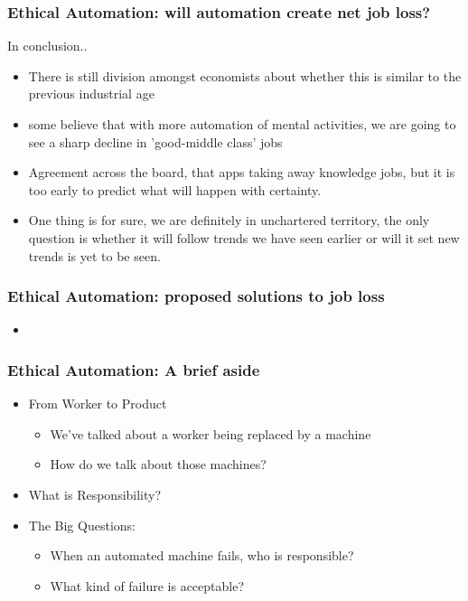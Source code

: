 \begin{frame}
  \frametitle{Ethical Automation: will automation create net job loss? }
  {\Large In conclusion..}
  \begin{itemize}
    \item There is still division amongst economists about whether this is similar to the previous industrial age
    \item some believe that with more automation of mental activities, we are going to see a sharp decline in 'good-middle class' jobs
    \item Agreement across the board, that apps taking away knowledge jobs, but it is too early to predict what will happen with certainty.
    \item One thing is for sure, we are definitely in unchartered territory, the only question is whether it will follow trends we have seen earlier or will it set new trends is yet to be seen.
  \end{itemize}
\end{frame}


\begin{frame}
  \frametitle{ Ethical Automation: proposed solutions to job loss}
  \begin{itemize}
    \item
  \end{itemize}
\end{frame}

\begin{frame}
  \frametitle{ Ethical Automation: A brief aside}
  \begin{itemize}
    \item From Worker to Product
      \begin{itemize}
        \item We've talked about a worker being replaced by a machine
        \item How do we talk about those machines?
      \end{itemize}
    \item What is Responsibility?
    \item The Big Questions:
      \begin{itemize}
        \item When an automated machine fails, who is responsible?
        \item What kind of failure is acceptable?
      \end{itemize}
  \end{itemize}
\end{frame}


